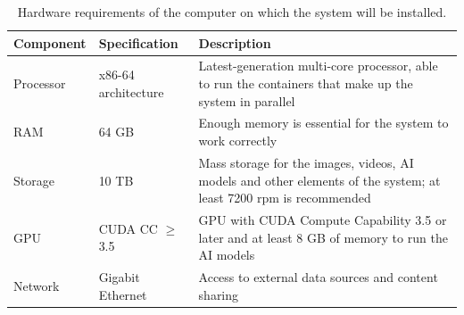 \begin{table}[ht!]
  \centering
  \small
  \caption{Hardware requirements of the computer on which the system will be installed.}
  \label{tab:hardware}
  \begin{tabular}{@{}l l p{9cm}@{}}
    \toprule
    \textbf{Component} & \textbf{Specification} & \textbf{Description} \\
    \midrule
    Processor & x86-64 architecture & Latest-generation multi-core processor, able to run
      the containers that make up the system in parallel \\
    RAM       & 64 GB  & Enough memory is essential for the system to work correctly \\
    Storage   & 10 TB  & Mass storage for the images, videos, AI models and other
      elements of the system; at least 7200 rpm is recommended \\
    GPU       & CUDA CC $\geq$ 3.5 & GPU with CUDA Compute Capability 3.5 or later and at
      least 8 GB of memory to run the AI models \\
    Network   & Gigabit Ethernet & Access to external data sources and content sharing \\
    \bottomrule
  \end{tabular}
\end{table}

